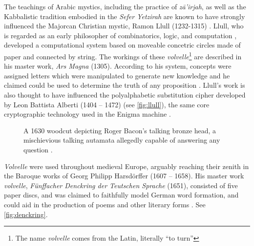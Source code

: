 The teachings of Arabic mystics, including the practice of \textit{z\={a}'irjah}, as well 
as the Kabbalistic tradition embodied in the \textit{Sefer Yetzirah}
are known to have strongly influenced the 
Majorcan Christian mystic, Ramon Llull (1232-1315) \citep{kahn1980,sepllull,link2010variantology}.
Llull, who is regarded as an early philosopher of combinatorics, logic, and 
computation \citep{sepllull,bonner2007art,knuth2013art}, developed 
a computational system based on moveable concetric circles made of paper
and connected by string. The workings of these \textit{volvelle}\footnote{The
    name \textit{volvelle} 
comes from the Latin, literally ``to turn''} are described in his master work,
\textit{Ars Magna} (1305). According to his system, concepts were assigned
letters which were manipulated to generate new knowledge and he claimed 
could be used to determine the truth of any proposition 
\citep{Crupi2019VolvellesOK}. Llull's work is also thought to have influenced 
the polyalphabetic substitution cipher developed by Leon Battista Alberti 
(1404 -- 1472) (see \autoref{fig:llull}), the same core cryptographic technology used 
in the Enigma machine  \citep{kahn1980}.


 \begin{figure}
    \center
    \noindent
    {%
        \setlength{\fboxsep}{0pt}%
        \setlength{\fboxrule}{1pt}%
}
\caption{A 1630 woodcut depicting Roger Bacon's talking bronze head, a mischievious talking autamata allegedly capable of answering any question \citep{hyman2016automaton}.}
\label{autamaton}
\end{figure}

\textit{Volvelle} were used throughout medieval Europe, arguably reaching
their zenith in the Baroque works of Georg Philipp Harsd{\"o}rffer (1607 -- 1658). His master work
\textit{volvelle},
\textit{F{\"u}nffacher Denckring der Teutschen Sprache} (1651), 
 consisted of five paper discs, and was claimed to faithfully model
 German word formation, and could aid in the production of poems and 
 other literary forms \citep{schafer2006literary}. See \autoref{fig:denckring}.



